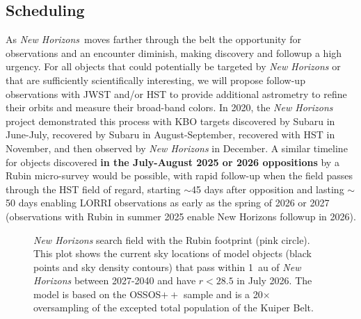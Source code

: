 \documentclass[modern,linenumbers,trackchanges,preprint]{aastex631}
\newcommand\nh{\textit{New Horizons}}
\begin{document}
\subsection{Scheduling}

As \nh\ moves farther through the belt the opportunity for observations and an encounter diminish, making discovery and followup a high urgency. For all objects that could potentially be targeted by {\it New Horizons} or that are sufficiently scientifically interesting, we will propose follow-up observations with JWST and/or HST to provide additional astrometry to refine their orbits and measure their broad-band colors.
In 2020, the {\it New Horizons} project demonstrated this process with KBO targets discovered by Subaru in June-July, recovered by Subaru in August-September, recovered with HST in November, and then observed by {\it New Horizons} in December.
A similar timeline for objects discovered {\bf in the July-August 2025 or 2026 oppositions} by a Rubin micro-survey would be possible, with rapid follow-up when the field passes through the HST field of regard, starting $\sim$45 days after opposition and lasting $\sim$50 days enabling LORRI observations as early as the spring of 2026 or 2027 (observations with Rubin in summer 2025 enable New Horizons followup in 2026).

\begin{figure}
\end{figure}

\begin{figure}
\caption{\label{fig-RubinField}
{\it New Horizons} search field with the Rubin footprint (pink circle). This plot shows the current sky locations of model objects (black points and sky density contours) that pass within 1~au of {\it New Horizons} between 2027-2040 and have $r<28.5$ in July 2026. The model is based on the OSSOS$++$ sample \citep{Petit2023DPS} and is a 20$\times$ oversampling of the excepted total population of the Kuiper Belt.}
\end{figure}
\end{document}
